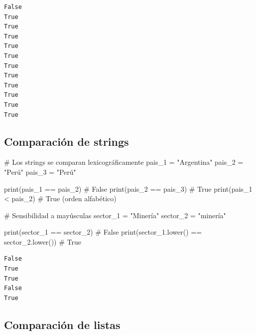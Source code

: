 \documentclass[
  doc,
  floatsintext,
  longtable,
  a4paper,
  nolmodern,
  notxfonts,
  notimes,
  12pt,
  colorlinks=true,linkcolor=blue,citecolor=blue,urlcolor=blue]{apa7}
\newenvironment{Shaded}{\begin{snugshade}}{\end{snugshade}}
\newcommand{\BuiltInTok}[1]{\textcolor[rgb]{0.00,0.23,0.31}{#1}}
\newcommand{\CommentTok}[1]{\textcolor[rgb]{0.37,0.37,0.37}{#1}}
\newcommand{\NormalTok}[1]{\textcolor[rgb]{0.00,0.23,0.31}{#1}}
\newcommand{\OperatorTok}[1]{\textcolor[rgb]{0.37,0.37,0.37}{#1}}
\newcommand{\StringTok}[1]{\textcolor[rgb]{0.13,0.47,0.30}{#1}}
\begin{document}
\begin{verbatim}
False
True
True
True
True
True
True
True
True
True
True
True
\end{verbatim}

\subsection{Comparación de strings}\label{comparaciuxf3n-de-strings}

\begin{Shaded}
\begin{Highlighting}[]
\CommentTok{\# Los strings se comparan lexicográficamente}
\NormalTok{pais\_1 }\OperatorTok{=} \StringTok{"Argentina"}
\NormalTok{pais\_2 }\OperatorTok{=} \StringTok{"Perú"}
\NormalTok{pais\_3 }\OperatorTok{=} \StringTok{"Perú"}

\BuiltInTok{print}\NormalTok{(pais\_1 }\OperatorTok{==}\NormalTok{ pais\_2)  }\CommentTok{\# False}
\BuiltInTok{print}\NormalTok{(pais\_2 }\OperatorTok{==}\NormalTok{ pais\_3)  }\CommentTok{\# True}
\BuiltInTok{print}\NormalTok{(pais\_1 }\OperatorTok{\textless{}}\NormalTok{ pais\_2)   }\CommentTok{\# True (orden alfabético)}

\CommentTok{\# Sensibilidad a mayúsculas}
\NormalTok{sector\_1 }\OperatorTok{=} \StringTok{"Minería"}
\NormalTok{sector\_2 }\OperatorTok{=} \StringTok{"minería"}

\BuiltInTok{print}\NormalTok{(sector\_1 }\OperatorTok{==}\NormalTok{ sector\_2)  }\CommentTok{\# False}
\BuiltInTok{print}\NormalTok{(sector\_1.lower() }\OperatorTok{==}\NormalTok{ sector\_2.lower())  }\CommentTok{\# True}
\end{Highlighting}
\end{Shaded}

\begin{verbatim}
False
True
True
False
True
\end{verbatim}

\subsection{Comparación de listas}\label{comparaciuxf3n-de-listas}
\end{document}
